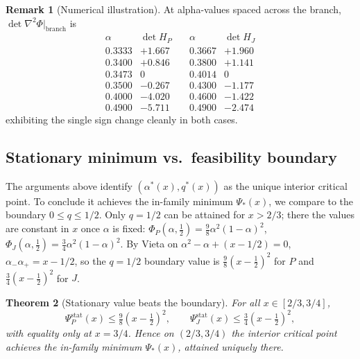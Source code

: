 \documentclass[11pt]{amsart}
\newtheorem{theorem}{Theorem}[section]
\theoremstyle{definition}
\newtheorem{remark}[theorem]{Remark}
\newcommand{\1}{\mathbf 1}
\begin{document}
\begin{remark}[Numerical illustration]
At alpha-values spaced across the branch, $\det\nabla^2\Phi\big|_{\text{branch}}$ is
\[
\begin{array}{c|c}
\alpha & \det H_P \\ \hline
0.3333 & +1.667 \\
0.3400 & +0.846 \\
0.3473 & 0      \\
0.3500 & -0.267 \\
0.4000 & -4.020 \\
0.4900 & -5.711
\end{array}
\quad
\begin{array}{c|c}
\alpha & \det H_J \\ \hline
0.3667 & +1.960 \\
0.3800 & +1.141 \\
0.4014 & 0      \\
0.4300 & -1.177 \\
0.4600 & -1.422 \\
0.4900 & -2.474
\end{array}
\]
exhibiting the single sign change cleanly in both cases.
\end{remark}

\subsection{Stationary minimum vs.\ feasibility boundary}
\label{ssec:cert-gap}

The arguments above identify $(\alpha^*(x),q^*(x))$ as the unique interior
critical point.  To conclude it achieves the in-family minimum $\Psi_*(x)$, we
compare to the boundary $0\le q\le1/2$.  Only $q=1/2$ can be attained for
$x>2/3$; there the values are constant in $x$ once $\alpha$ is fixed:
$\Phi_P(\alpha,\tfrac12)=\tfrac98\alpha^2(1-\alpha)^2$,
$\Phi_J(\alpha,\tfrac12)=\tfrac34\alpha^2(1-\alpha)^2$.  By Vieta on
$\alpha^2-\alpha+(x-1/2)=0$, $\alpha_-\alpha_+=x-1/2$, so the $q=1/2$ boundary
value is $\tfrac98(x-\tfrac12)^2$ for $P$ and $\tfrac34(x-\tfrac12)^2$ for $J$.

\begin{theorem}[Stationary value beats the boundary]
\label{thm:stat-vs-bdry}
For all $x\in[2/3,3/4]$,
\[
   \Psi_P^{\text{stat}}(x) \le \tfrac98 (x-\tfrac12)^2,
   \qquad
   \Psi_J^{\text{stat}}(x) \le \tfrac34 (x-\tfrac12)^2,
\]
with equality only at $x=3/4$.  Hence on $(2/3,3/4)$ the interior critical point
achieves the in-family minimum $\Psi_*(x)$, attained uniquely there.
\end{theorem}
\end{document}
